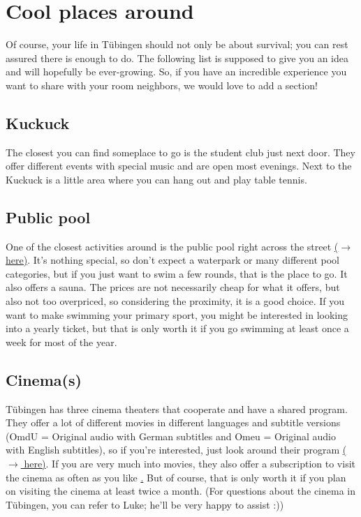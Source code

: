 \section{Cool places around}
Of course, your life in Tübingen should not only be about survival; you can rest assured there is enough to do. The following list is supposed to give you an idea and will hopefully be ever-growing. So, if you have an incredible experience you want to share with your room neighbors, we would love to add a section!

\subsection{Kuckuck}
The closest you can find someplace to go is the student club  just next door. They offer different events with special music and are open most evenings. Next to the Kuckuck is a little area where you can hang out and play table tennis.

\subsection{Public pool}
One of the closest activities around is the public pool right across the street \href{https://maps.app.goo.gl/NZaCajzPTgFjabqH6}{($\xrightarrow{}$ here)}. It's nothing special, so don't expect a waterpark or many different pool categories, but if you just want to swim a few rounds, that is the place to go. It also offers a sauna. The prices are not necessarily cheap for what it offers, but also not too overpriced, so considering the proximity, it is a good choice. If you want to make swimming your primary sport, you might be interested in looking into a yearly ticket, but that is only worth it if you go swimming at least once a week for most of the year.

\subsection{Cinema(s)}
Tübingen has three cinema theaters that cooperate and have a shared program. They offer a lot of different movies in different languages and subtitle versions (OmdU = Original audio with German subtitles and Omeu = Original audio with English subtitles), so if you're interested, just look around their program \href{https://tuebinger-kinos.de/programmuebersicht/}{($\xrightarrow{}$ here)}.
If you are very much into movies, they also offer a subscription to visit the cinema as often as you like \href{https://tuebinger-kinos.de/unlimited/}. But of course, that is only worth it if you plan on visiting the cinema at least twice a month.
(For questions about the cinema in Tübingen, you can refer to Luke; he'll be very happy to assist :))

